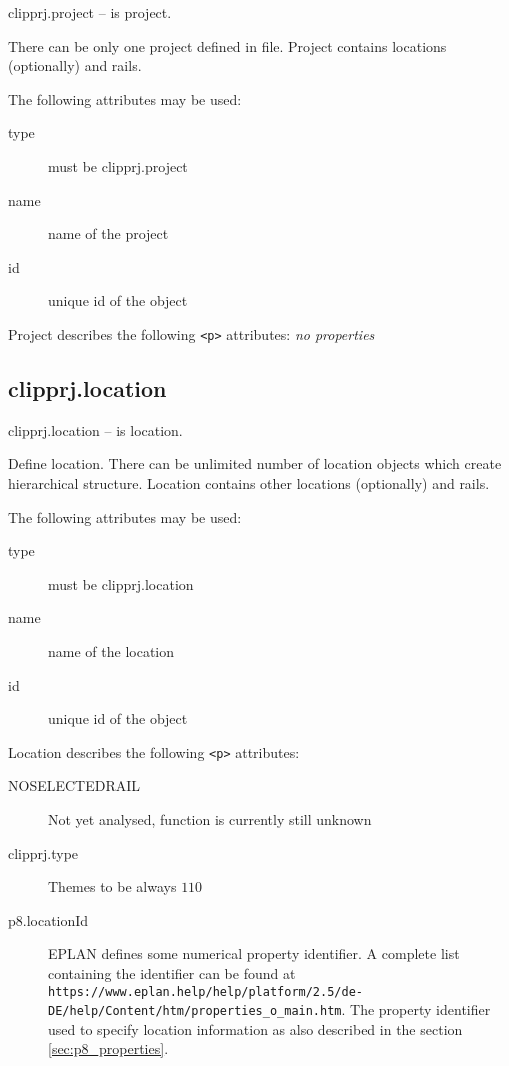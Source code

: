 \documentclass[%
	a4paper,
	oneside,
	listof=numbered,
	parskip=half,
	headsepline=true,
	footsepline=false,
	0.7headlines,
	]{scrbook}
\begin{document}
clipprj.project – is project.

There can be only one project defined in file.
Project contains locations (optionally) and rails.

The following attributes may be used:

\begin{description}
	\item[type] must be clipprj.project
	\item[name] name of the project
	\item[id] unique id of the object
\end{description}
 
Project describes the following \verb|<p>| attributes: \emph{no properties}

\subsection{clipprj.location}
 
clipprj.location – is location. 

Define location.
There can be unlimited number of location objects which create hierarchical structure.
Location contains other locations (optionally) and rails.

The following attributes may be used:

\begin{description}
	\item[type] must be clipprj.location
	\item[name] name of the location
	\item[id] unique id of the object
\end{description}

Location describes the following \verb|<p>| attributes:

\begin{description}
	\item[{NO\textunderscore SELECTED\textunderscore RAIL}] Not yet analysed, function is currently still unknown
	\item[clipprj.type] Themes to be always $110$
	\item[p8.locationId] EPLAN defines some numerical property identifier.
	A complete list containing the identifier can be found at \verb|https://www.eplan.help/help/platform/2.5/de-DE/help/Content/htm/properties_o_main.htm|.
	The property identifier used to specify location information as also described in the section \ref{sec:p8_properties}.
\end{description}
\end{document}
